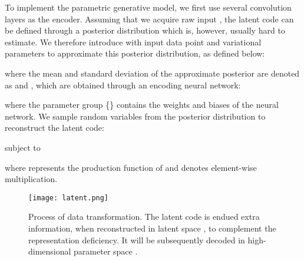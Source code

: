 \documentclass[10pt,conference,a4paper]{IEEEtran}
\begin{document}
To implement the parametric generative model, we first use several convolution layers as the encoder. Assuming that we acquire raw input , the latent code  can be defined through a posterior distribution  which is, however, usually hard to estimate. We therefore introduce  with input data point  and variational parameters  to approximate this posterior distribution, as defined below: 

where the mean and standard deviation of the approximate posterior are denoted as  and , which are obtained through an encoding neural network: 

where the parameter group \{\} contains the weights and biases of the neural network. We sample random variables from the posterior distribution  to reconstruct the latent code: 

subject to 

where  represents the production function of  and  denotes element-wise multiplication.

\begin{figure}[tbp]
	\centerline{\texttt{[image: latent.png]}}
	\caption{Process of data transformation. The latent code is endued extra information, when reconstructed in latent space , to complement the representation deficiency. It will be subsequently decoded in high-dimensional parameter space .}
	\label{latent}
\end{figure}
\end{document}
